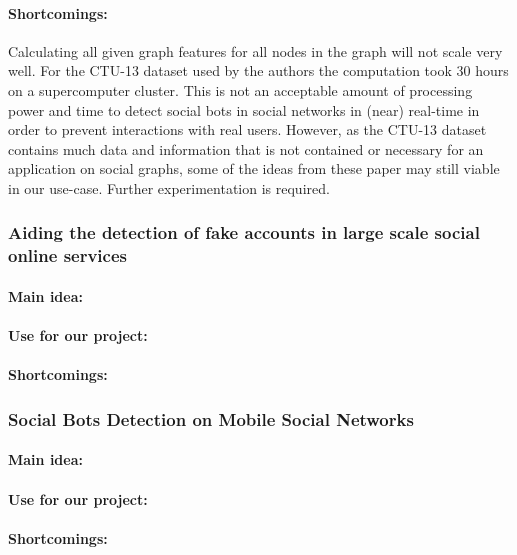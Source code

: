 \paragraph{Shortcomings:}
Calculating all given graph features for all nodes in the graph will not scale very well. For the CTU-13 dataset used by the authors the computation took 30 hours on a supercomputer cluster. This is not an acceptable amount of processing power and time to detect social bots in social networks in (near) real-time in order to prevent interactions with real users. However, as the CTU-13 dataset contains much data and information that is not contained or necessary for an application on social graphs, some of the ideas from these paper may still viable in our use-case. Further experimentation is required.

\subsubsection{Aiding the detection of fake accounts in large scale social online services}

\paragraph{Main idea:}
\cite{cao2012aiding}

\paragraph{Use for our project:}

\paragraph{Shortcomings:}

\subsubsection{Social Bots Detection on Mobile Social Networks}

\paragraph{Main idea:}
\cite{binlin2017social}

\paragraph{Use for our project:}

\paragraph{Shortcomings:}


